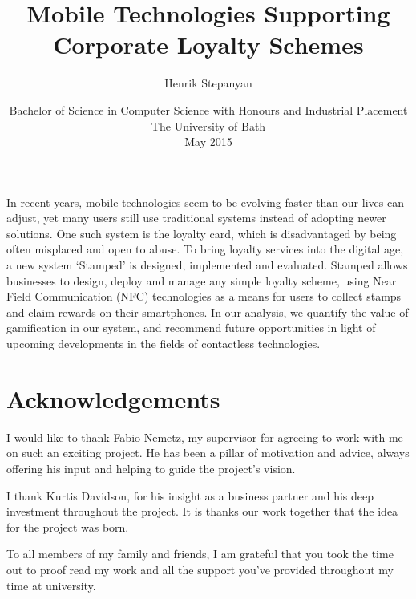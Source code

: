 \documentclass[11pt,openright,a4paper]{report}
\title{Mobile Technologies Supporting Corporate Loyalty Schemes}
\author{Henrik Stepanyan}
\date{Bachelor of Science in Computer Science with Honours and Industrial
Placement\\The University of Bath\\May 2015}
\begin{document}
\lstset{language=Java,breaklines,breakatwhitespace,basicstyle=\small}


\setcounter{page}{0}


\maketitle
\newpage


\newpage


\newpage


\abstract
In recent years, mobile technologies seem to be evolving faster than our lives can adjust, yet many users still use traditional systems instead of adopting newer solutions. One such system is the loyalty card, which is disadvantaged by being often misplaced and open to abuse. To bring loyalty services into the digital age, a new system `Stamped' is designed, implemented and evaluated. Stamped allows businesses to design, deploy and manage any simple loyalty scheme, using Near Field Communication (NFC) technologies as a means for users to collect stamps and claim rewards on their smartphones. In our analysis, we quantify the value of gamification in our system, and recommend future opportunities in light of upcoming developments in the fields of contactless technologies. 
\newpage


\tableofcontents
\listoffigures
\listoftables
\newpage

\chapter*{Acknowledgements}
I would like to thank Fabio Nemetz, my supervisor for agreeing to work with me
on such an exciting project. He has been a pillar of motivation and advice,
always offering his input and helping to guide the project's vision.

I thank Kurtis Davidson, for his insight as a business partner and his deep
investment throughout the project. It is thanks our work together that the idea
for the project was born.

To all members of my family and friends, I am grateful that you took the time 
out to proof read my work and all the support you've provided throughout
my time at university.
\end{document}
